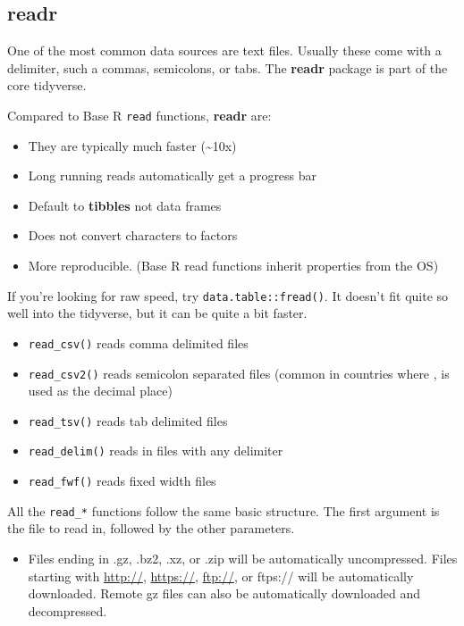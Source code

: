 \documentclass[]{book}
\providecommand{\tightlist}{%
  \setlength{\itemsep}{0pt}\setlength{\parskip}{0pt}}
\newenvironment{rmdblock}[1]
  {\begin{shaded*}
  \begin{itemize}
  \renewcommand{\labelitemi}{
    \raisebox{-.7\height}[0pt][0pt]{
      {\setkeys{Gin}{width=3em,keepaspectratio}\texttt{[image: images/\#1]}}
    }
  }
  \item
  }
  {
  \end{itemize}
  \end{shaded*}
  }
\newenvironment{rmdnote}
  {\begin{rmdblock}{note}}
  {\end{rmdblock}}
\theoremstyle{definition}
\theoremstyle{definition}
\theoremstyle{definition}
\theoremstyle{remark}
\let\BeginKnitrBlock\begin \let\EndKnitrBlock\end
\begin{document}
\subsection{readr}\label{readr}

One of the most common data sources are text files. Usually these come
with a delimiter, such a commas, semicolons, or tabs. The \textbf{readr}
package is part of the core tidyverse.

Compared to Base R \texttt{read} functions, \textbf{readr} are:

\begin{itemize}
\tightlist
\item
  They are typically much faster (\textasciitilde{}10x)
\item
  Long running reads automatically get a progress bar
\item
  Default to \textbf{tibbles} not data frames
\item
  Does not convert characters to factors
\item
  More reproducible. (Base R read functions inherit properties from the
  OS)
\end{itemize}

\BeginKnitrBlock{rmdtip}
If you're looking for raw speed, try \texttt{data.table::fread()}. It
doesn't fit quite so well into the tidyverse, but it can be quite a bit
faster.
\EndKnitrBlock{rmdtip}

\begin{itemize}
\tightlist
\item
  \texttt{read\_csv()} reads comma delimited files
\item
  \texttt{read\_csv2()} reads semicolon separated files (common in
  countries where , is used as the decimal place)
\item
  \texttt{read\_tsv()} reads tab delimited files
\item
  \texttt{read\_delim()} reads in files with any delimiter
\item
  \texttt{read\_fwf()} reads fixed width files
\end{itemize}

All the \texttt{read\_*} functions follow the same basic structure. The
first argument is the file to read in, followed by the other parameters.

\begin{rmdnote}
Files ending in .gz, .bz2, .xz, or .zip will be automatically
uncompressed. Files starting with \url{http://}, \url{https://},
\url{ftp://}, or ftps:// will be automatically downloaded. Remote gz
files can also be automatically downloaded and decompressed.
\end{rmdnote}
\end{document}
